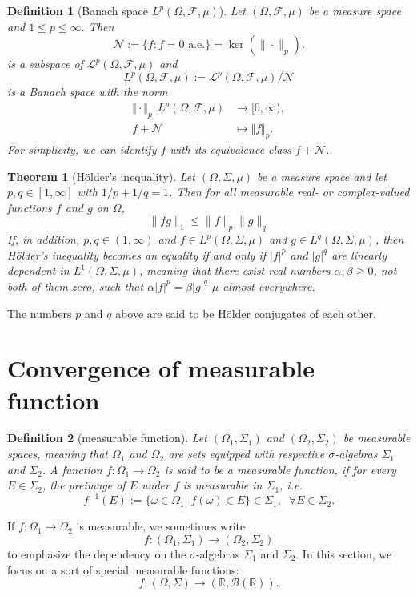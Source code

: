 \documentclass{report}
\newtheorem{definition}{Definition}[section]
\newtheorem{theorem}{Theorem}[section]
\theoremstyle{nonumberplain}
\begin{document}
\begin{definition}[Banach space $L^p(\Omega, \mathcal{F}, \mu)$] Let $(\Omega, \mathcal{F}, \mu)$ be a measure space and $1\le p \leq\infty$. Then
	\[
	\mathcal{N}:=\{f: f=0\text{ a.e.}\}=\operatorname{ker}\left(\|\cdot\|_{p}\right).
	\]
	is a subspace of $\mathcal{L}^{p}(\Omega, \mathcal{F}, \mu)$ and
	\[
	L^{p}(\Omega, \mathcal{F}, \mu):=\mathcal{L}^{p}(\Omega, \mathcal{F}, \mu)/\mathcal{N}
	\]
	is a Banach space with the norm
	\begin{align*}
	\Vert \cdot\Vert_p:L^{p}(\Omega, \mathcal{F}, \mu)&\longrightarrow [0,\infty),\\
	f+\mathcal{N} &\longmapsto \Vert f\Vert_p.
	\end{align*}
    For simplicity, we can identify $f$ with its equivalence class $f+\mathcal{N}$.
\end{definition}

\begin{theorem}[Hölder's inequality]
	Let $(\Omega, \Sigma, \mu)$ be a measure space and let $p, q \in[1, \infty]$ with $1 / p+1 / q=1$. Then for all measurable real- or complex-valued functions $f$ and $g$ on $\Omega$,
\[
\|f g\|_{1} \leq\|f\|_{p}\|g\|_{q}
\]
If, in addition, $p, q \in(1, \infty)$ and $f \in L^{p}(\Omega, \Sigma, \mu)$ and $g \in L^{q}(\Omega, \Sigma, \mu)$, then Hölder's inequality becomes an equality if and only if $|f|^{p}$ and $|g|^{q}$ are linearly dependent in $L^{1}(\Omega, \Sigma, \mu)$, meaning that there exist real numbers $\alpha, \beta \geq 0$, not both of them zero, such that $\alpha|f|^{p}=\beta|g|^{q}$ $\mu$-almost everywhere.
\end{theorem}

The numbers $p$ and $q$ above are said to be Hölder conjugates of each other. 

\section{Convergence of measurable function}
\begin{definition}[measurable function]
	Let $(\Omega_1,\Sigma_1 )$ and $(\Omega_2,\Sigma_2)$ be measurable spaces, meaning that $\Omega_1$ and $\Omega_2$ are sets equipped with respective $\sigma$-algebras $\Sigma_1$ and $\Sigma_2$. A function $f:\Omega_1\to \Omega_2$ is said to be a \emph{measurable function}, if for every $E\in \Sigma_2$, the preimage of $E$ under $f$ is measurable in $\Sigma_1$, i.e.
	\[
	f^{-1}(E):=\{\omega\in \Omega_1|\;f(\omega)\in E\}\in \Sigma_1 ,\;\;\forall E\in\Sigma_2.
	\]
\end{definition}
If $f:\Omega_1\to \Omega_2$ is measurable, we sometimes write
$$f\colon (\Omega_1,\Sigma_1 )\rightarrow (\Omega_2,\Sigma_2 )$$
to emphasize the dependency on the $\sigma$-algebras $\Sigma_1$ and $\Sigma_2$.
In this section, we focus on a sort of special measurable functions:
\[
f\colon (\Omega,\Sigma )\rightarrow (\mathbb{R},\mathcal{B}(\mathbb{R}) ).
\]   
\end{document}
